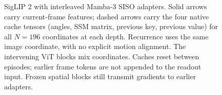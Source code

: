 \begin{figure}[t]
\caption{SigLIP 2 with interleaved Mamba-3 SISO adapters. Solid arrows carry current-frame
features; dashed arrows carry the four native cache tensors (angles, SSM
matrix, previous key, previous value) for all $N=196$ coordinates at each
depth. Recurrence uses the same image coordinate, with no explicit motion
alignment. The intervening ViT blocks mix coordinates. Caches reset between
episodes; earlier frame tokens are not appended to the readout input.
Frozen spatial blocks still transmit gradients to earlier adapters.}
\label{fig:architecture}
\end{figure}
